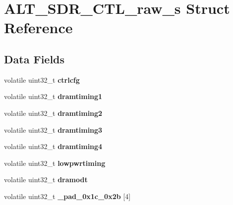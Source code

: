 \hypertarget{structALT__SDR__CTL__raw__s}{}\section{A\+L\+T\+\_\+\+S\+D\+R\+\_\+\+C\+T\+L\+\_\+raw\+\_\+s Struct Reference}
\label{structALT__SDR__CTL__raw__s}
\subsection*{Data Fields}
\begin{DoxyCompactItemize}
\item 
\mbox{\label{structALT__SDR__CTL__raw__s_a9ad9a252402c4cf650ff337b829c47d1}} 
volatile uint32\+\_\+t {\bfseries ctrlcfg}
\item 
\mbox{\label{structALT__SDR__CTL__raw__s_a4236e4d49bbf95072bb4d81964dd2ef3}} 
volatile uint32\+\_\+t {\bfseries dramtiming1}
\item 
\mbox{\label{structALT__SDR__CTL__raw__s_a71b0193df56cf37a78c0cf771cd39731}} 
volatile uint32\+\_\+t {\bfseries dramtiming2}
\item 
\mbox{\label{structALT__SDR__CTL__raw__s_ac91bf18b92965f0acc3e8d716c05dba2}} 
volatile uint32\+\_\+t {\bfseries dramtiming3}
\item 
\mbox{\label{structALT__SDR__CTL__raw__s_a4972e9f26e08f538db1d5789a9cb7755}} 
volatile uint32\+\_\+t {\bfseries dramtiming4}
\item 
\mbox{\label{structALT__SDR__CTL__raw__s_aec009cdf2b57551ec8db7fda68986e77}} 
volatile uint32\+\_\+t {\bfseries lowpwrtiming}
\item 
\mbox{\label{structALT__SDR__CTL__raw__s_a3cceff842dc2e5ddacae3dc435350daf}} 
volatile uint32\+\_\+t {\bfseries dramodt}
\item 
\mbox{\label{structALT__SDR__CTL__raw__s_adb65194db8e90fbe1ac5169af9345a08}} 
volatile uint32\+\_\+t {\bfseries \+\_\+pad\+\_\+0x1c\+\_\+0x2b} \mbox{[}4\mbox{]}

\end{DoxyCompactItemize}
